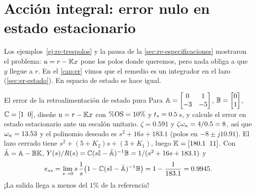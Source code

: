 \section{Acción integral: error nulo en estado estacionario}
\label{sec:re-integral}

Los ejemplos~\ref{ej:re-trespolos} y la pausa de la \cref{sec:re-especificaciones} mostraron el problema: $u=r-\mathbb{K} x$ pone los polos donde queremos, pero nada obliga a que $y$ llegue a $r$. En el \cref{cap:er} vimos que el remedio es un integrador en el lazo (\cref{sec:er-estado}). En espacio de estado se hace igual.

\begin{ejemplo}[label=ej:re-sinintegral]{El error de la retroalimentación de estado pura}
Para $\mathbb{A}=\begin{bmatrix}0&1\\-3&-5\end{bmatrix}$, $\mathbb{B}=\begin{bmatrix}0\\1\end{bmatrix}$, $\mathbb{C}=[1\;\;0]$, diseñe $u=r-\mathbb{K} x$ con $\%\mathrm{OS}=10\%$ y $t_s=0.5$\,s, y calcule el error en estado estacionario ante un escalón unitario.
\solucion $\zeta=0.591$ y $\zeta\omega_n=4/0.5=8$, así que $\omega_n=13.53$ y el polinomio deseado es $s^2+16s+183.1$ (polos en $-8\pm j10.91$). El lazo cerrado tiene $s^2+(5+K_2)s+(3+K_1)$, luego $\mathbb{K}=[180.1\;\;11]$. Con $\bar{\mathbb{A}}=\mathbb{A}-\mathbb{B}\mathbb{K}$, $Y(s)/R(s)=\mathbb{C}(s\mathbb{I}-\bar{\mathbb{A}})^{-1}\mathbb{B}=1/(s^2+16s+183.1)$ y
\[
  e_{ss}=\lim_{s\to0}s\,\frac1s\bigl(1-\mathbb{C}(s\mathbb{I}-\bar{\mathbb{A}})^{-1}\mathbb{B}\bigr)=1-\frac{1}{183.1}=0.9945.
\]
¡La salida llega a menos del $1\%$ de la referencia!
\end{ejemplo}

